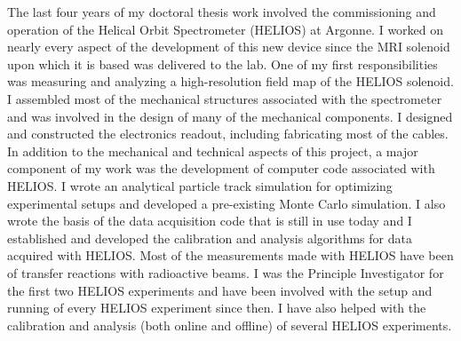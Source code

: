 The last four years of my doctoral thesis work involved the %
commissioning and operation of the Helical Orbit Spectrometer (HELIOS) at Argonne.  I worked on nearly every aspect of the development of this new device since the MRI solenoid upon which it is based was delivered to the lab.  One of my first responsibilities was measuring and analyzing a high-resolution field map of the HELIOS solenoid.  I assembled most of the mechanical structures associated with the spectrometer and was involved in the design of many of the mechanical components.
I designed and constructed the electronics readout, including fabricating most of the cables.
In addition to the mechanical and technical aspects of this project, a major component of my work was the development of computer code associated with %
HELIOS.  I wrote an analytical particle track simulation for optimizing experimental setups and developed a pre-existing Monte Carlo simulation.  I also wrote the basis of the data acquisition code that is still in use today and I established and developed the calibration and analysis algorithms for data acquired with HELIOS.  Most of the measurements made with HELIOS have been of transfer reactions with radioactive beams.  I was the Principle Investigator for the first two HELIOS experiments and have been involved with the setup and running of every HELIOS experiment since then. %
I have also helped with the calibration and analysis (both online and offline) of several HELIOS experiments.

